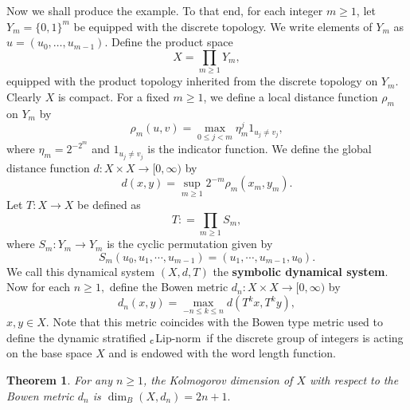 \documentclass[a4paper,11pt,reqno]{amsart}
\theoremstyle{plain}
\newtheorem{thm}{Theorem}[section]
\theoremstyle{mainthmstyle}
\theoremstyle{named}
\numberwithin{equation}{section}
\newcommand{\clipnorm}{$_{\text{\rm c}}$Lip-norm}
\begin{document}
Now we shall produce the example. To that end, for each integer $m \ge 1$, let $Y_m = \{0, 1\}^m$ be equipped with the discrete topology. We write elements of $Y_m$ as $u = (u_0, \dots, u_{m-1})$. Define the product space
$$X = \prod_{m \ge 1} Y_m,$$ equipped with the product topology inherited from the discrete topology on $Y_m.$
Clearly $X$ is compact. For a fixed $m \ge 1$, we define a local distance function $\rho_m$ on $Y_m$ by
$$\rho_m(u, v) = \max_{0 \le j < m} \eta_m^j 1_{u_j \neq v_j},$$
where $\eta_m = 2^{-2^m}$ and $1_{u_j \neq v_j}$ is the indicator function. We define the global distance function $d : X \times X \to [0, \infty)$ by
$$d(x, y) = \sup_{m \ge 1} 2^{-m} \rho_m(x_m, y_m).$$
Let $T : X \rightarrow X$ be defined as $$T : = \prod\limits_{m \geq 1} S_m,$$ where $S_m : Y_m \rightarrow Y_m$ is the cyclic permutation given by
$$S_m \left (u_0, u_1, \cdots, u_{m - 1} \right ) = \left (u_1, \cdots, u_{m - 1}, u_{0} \right ).$$
We call this dynamical system $(X,d,T)$ the {\bf symbolic dynamical system}.
Now for each $n \geq 1,$ define the Bowen metric $d_n : X \times X \rightarrow [0, \infty)$ by
$$d_n (x, y) = \max\limits_{-n \leq k \leq n} d \left (T^{k} x, T^{k} y \right ),$$ $x,y \in X.$ Note that this metric coincides with the Bowen type metric used to define the dynamic stratified \clipnorm\ if the discrete group of integers is acting on the base space $X$ and is endowed with the word length function.  

\begin{thm}
For any $n \ge 1$, the Kolmogorov dimension of $X$ with respect to the Bowen metric $d_n$ is $\dim_B(X, d_n) = 2 n + 1.$
\end{thm}
\end{document}
